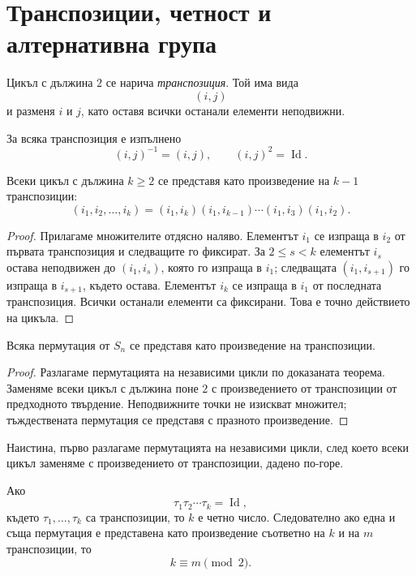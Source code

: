 \section{Транспозиции, четност и алтернативна група}\label{s:31.3}

\begin{defn}
Цикъл с дължина $2$ се нарича \emph{транспозиция}. Той има вида
\[
(i,j)
\]
и разменя $i$ и $j$, като оставя всички останали елементи неподвижни.
\end{defn}

За всяка транспозиция е изпълнено
\[
(i,j)^{-1}=(i,j),\qquad (i,j)^2=\operatorname{Id}.
\]

\begin{prop}
Всеки цикъл с дължина $k\ge2$ се представя като произведение на $k-1$ транспозиции:
\[
(i_1,i_2,\ldots,i_k)
=
(i_1,i_k)(i_1,i_{k-1})\cdots(i_1,i_3)(i_1,i_2).
\]
\end{prop}

\begin{proof}
Прилагаме множителите отдясно наляво. Елементът $i_1$ се изпраща в $i_2$ от първата транспозиция и следващите го фиксират. За $2\le s<k$ елементът $i_s$ остава неподвижен до $(i_1,i_s)$, която го изпраща в $i_1$; следващата $(i_1,i_{s+1})$ го изпраща в $i_{s+1}$, където остава. Елементът $i_k$ се изпраща в $i_1$ от последната транспозиция. Всички останали елементи са фиксирани. Това е точно действието на цикъла.
\end{proof}



\begin{cor}
Всяка пермутация от $S_n$ се представя като произведение на транспозиции.
\end{cor}

\begin{proof}
Разлагаме пермутацията на независими цикли по доказаната теорема. Заменяме всеки цикъл с дължина поне $2$ с произведението от транспозиции от предходното твърдение. Неподвижните точки не изискват множител; тъждествената пермутация се представя с празното произведение.
\end{proof}

Наистина, първо разлагаме пермутацията на независими цикли, след което всеки цикъл заменяме с произведението от транспозиции, дадено по-горе.

\begin{thm}
Ако
\[
\tau_1\tau_2\cdots\tau_k=\operatorname{Id},
\]
където $\tau_1,\ldots,\tau_k$ са транспозиции, то $k$ е четно число. Следователно ако една и съща пермутация е представена като произведение съответно на $k$ и на $m$ транспозиции, то
\[
k\equiv m\pmod 2.
\]
\end{thm}

